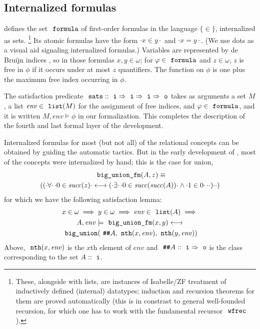 \subsection{Internalized formulas}
\label{sec:internalized-formulas}

 defines the set $\formula$ of first-order 
formulas in the language $\{ \in \}$, internalized as sets.%
\footnote{These, alongside with lists, are instances of
Isabelle/ZF treatment of inductively defined (internal) datatypes;
induction and recursion theorems for them are proved automatically
(this is in constrast to general well-founded recursion, for which
one has to work with the fundamental recursor $\isatt{wfrec}$).}  Its
atomic formulas have the form $\cdot x \in y\cdot$ and $\cdot x =
y\cdot$. (We use dots as a visual aid signaling internalized formulas.)
Variables are represented by de Bruijn indices \cite{MR0321704}, so in
those formulas $x,y \in \omega$; for $\phi\in\formula$ and
$z\in\omega$, $z$ is free in $\phi$ if it occurs under at most $z$
quantifiers. The  function on $\phi$ is one plus the
maximum free index occurring in $\phi$.

The satisfaction predicate
$\isatt{sats}::\tyi\fun\tyi\fun\tyi\fun\tyo$ takes as arguments a set
$M$, a list $\mathit{env}\in\isatt{list}(M)$ for the assignment of
free indices, and $\phi\in\formula$, and it is written
$M,\mathit{env}\models\phi$ in our formalization.
This completes the
description of the fourth and last formal layer of the development.

Internalized formulas for most (but not all) of the relational
concepts can be obtained by guiding the automatic tactics. But in the
early development of 
, most of the concepts were internalized by
hand; this is the case for union,
\begin{multline*}
  \isatt{big{\uscore}union{\uscore}fm}(A,z) \equiv \\
  (({\cdot}\forall{\cdot}\,{\cdot}0 \in \mathit{succ}(z){\cdot} \longleftrightarrow
  ({\cdot}\exists{\cdot}\,{\cdot}0 \in \mathit{succ}(\mathit{succ}(A)){\cdot} \land {\cdot}1 \in
  0{\cdot}\,{\cdot}{\cdot}){\cdot}{\cdot})
\end{multline*}
for which we have the following satisfaction lemma:
\begin{multline}\label{eq:sats_big_union_fm}
  x \in \omega \implies y \in \omega \implies \mathit{env} \in \isatt{list}(A)
  \implies \\
  A, \mathit{env} \models \isatt{big{\uscore}union{\uscore}fm}(x,y)%
  \longleftrightarrow \\
  \isatt{big{\uscore}union}(\isatt{\#\#} A, \isatt{nth}(x,
  \mathit{env}), \isatt{nth}(y, \mathit{env}))
\end{multline}
Above, $\isatt{nth}(x,\mathit{env})$ is the $x$th element of $\mathit{env}$
and $\isatt{\#\#}A::\tyi\fun \tyo$ is the class corresponding to the
set $A::\tyi$.

